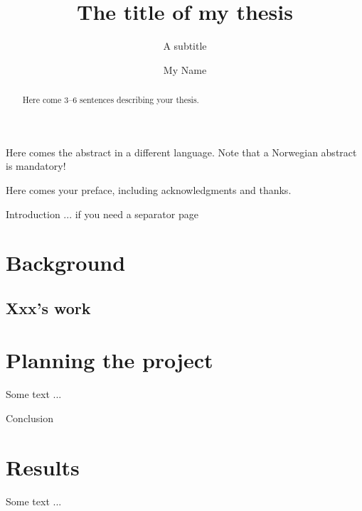 \documentclass[UKenglish]{uiophdthesis}   %
\title{The title of my thesis}        %
\subtitle{A subtitle}                 %
\author{My Name}                      %
\begin{document}
\frontmatter{}
\maketitle[
  supervisor={A Supervisor},
]

\begin{abstract}
  Here come 3--6 sentences describing your thesis.
\end{abstract}
\begin{xabstract}[Sammendrag]               %
  Here comes the abstract in a different language.
  Note that a Norwegian abstract is mandatory!
\end{xabstract}

\tableofcontents{}                          %
\listoffigures{}                            %
\listoftables{}                             %

\begin{preface}
  Here comes your preface, including acknowledgments and thanks.
\end{preface}

\mainmatter{}
\begin{uioseparatorpage}{Introduction}  %
  ... if you need a separator page
\end{uioseparatorpage}

\chapter{Background}                    %
\section{Xxx's work}                    %

\chapter{Planning the project}        %
Some text ...


\begin{uioseparatorpage}{Conclusion}  %
\end{uioseparatorpage}

\chapter{Results}                     %
Some text ...

\backmatter{}
\printbibliography{}
\end{document}
